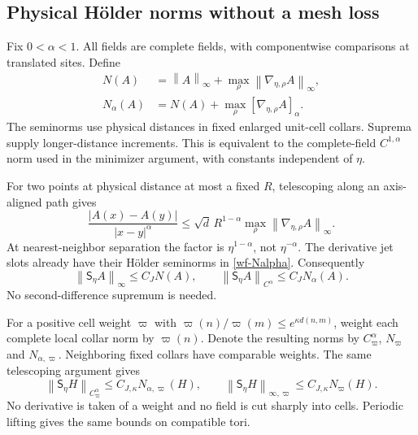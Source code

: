 \documentclass[11pt]{article}
\theoremstyle{remark}
\newcommand{\norm}[1]{\left\|#1\right\|}
\begin{document}
\subsection{Physical H\"older norms without a mesh loss}

Fix $0<\alpha<1$. All fields are complete fields, with
componentwise comparisons at translated sites. Define
\begin{equation}\label{wf-Nalpha}
 \begin{split}
 N(A)&=\norm{A}_\infty+
                  \max_\rho\norm{\nabla_{\eta,\rho}A}_\infty,\\
 N_\alpha(A)&=N(A)+
                  \max_\rho[\nabla_{\eta,\rho}A]_\alpha.
 \end{split}
\end{equation}
The seminorms use physical distances in fixed enlarged
unit-cell collars. Suprema supply longer-distance
increments. This is equivalent to the complete-field
$C^{1,\alpha}$ norm used in the minimizer argument, with
constants independent of $\eta$.

For two points at physical distance at most a fixed $R$,
telescoping along an axis-aligned path gives
\begin{equation}\label{wf-holder-telescoping}
 \frac{|A(x)-A(y)|}{|x-y|^\alpha}
 \le\sqrt d\,R^{1-\alpha}
                      \max_\rho\norm{\nabla_{\eta,\rho}A}_\infty.
\end{equation}
At nearest-neighbor separation the factor is
$\eta^{1-\alpha}$, not $\eta^{-\alpha}$. The derivative
jet slots already have their H\"older seminorms in
\eqref{wf-Nalpha}. Consequently
\begin{equation}\label{wf-jet-norm}
 \norm{\mathsf S_\eta A}_\infty\le C_JN(A),\qquad
 \norm{\mathsf S_\eta A}_{C^\alpha}\le C_JN_\alpha(A).
\end{equation}
No second-difference supremum is needed.

For a positive cell weight $\varpi$ with
$\varpi(n)/\varpi(m)\le e^{\kappa d(n,m)}$, weight each
complete local collar norm by $\varpi(n)$. Denote the
resulting norms by $C^\alpha_\varpi$, $N_\varpi$ and
$N_{\alpha,\varpi}$. Neighboring fixed collars have
comparable weights. The same telescoping argument gives
\begin{equation}\label{wf-weighted-jet}
 \norm{\mathsf S_\eta H}_{C^\alpha_\varpi}
       \le C_{J,\kappa}N_{\alpha,\varpi}(H),\qquad
 \norm{\mathsf S_\eta H}_{\infty,\varpi}
       \le C_{J,\kappa}N_\varpi(H).
\end{equation}
No derivative is taken of a weight and no field is cut
sharply into cells. Periodic lifting gives the same bounds
on compatible tori.
\end{document}

